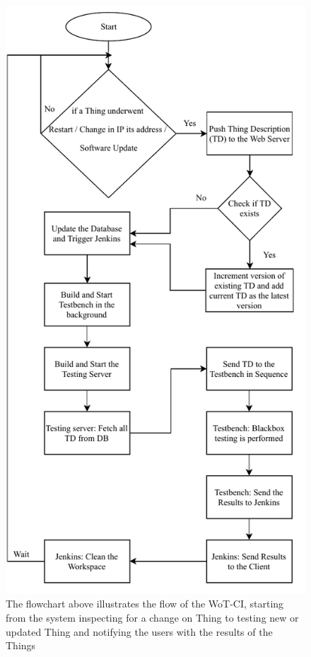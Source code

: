 \documentclass[conference]{IEEEtran}
\theoremstyle{definition}
\begin{document}
\begin{figure}[t]
  \centerline{\includegraphics[scale=0.88]{SystemFlowChart} }
  
  \caption{The flowchart above illustrates the flow of the WoT-CI, starting from the system inspecting for a change on Thing to testing new or updated Thing and notifying the users with the results of the Things}
  \label{fig:Algorithm}
\end{figure}
\end{document}
